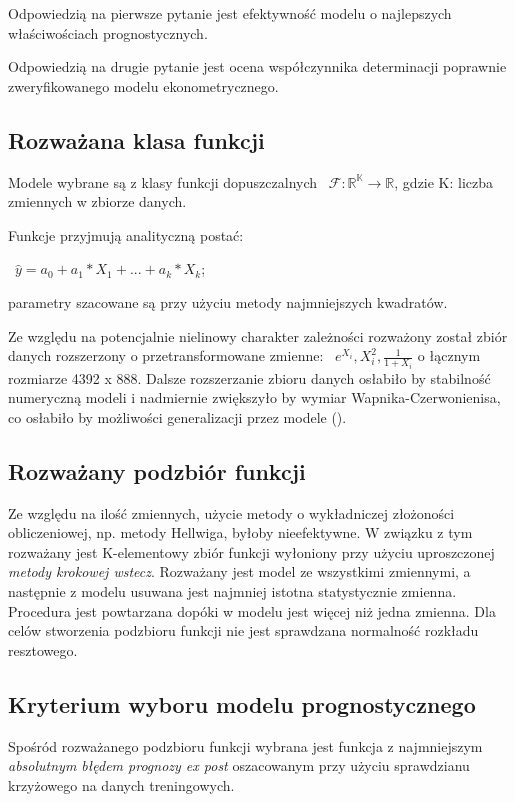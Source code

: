 \documentclass{article}
\begin{document}
Odpowiedzią na pierwsze pytanie jest efektywność modelu o najlepszych właściwościach prognostycznych.

Odpowiedzią na drugie pytanie jest ocena współczynnika determinacji poprawnie zweryfikowanego modelu ekonometrycznego.

\subsection{Rozważana klasa funkcji}
Modele wybrane są z klasy funkcji dopuszczalnych ~$\mathscr{F}: \mathbb{R^K\to R}$,
gdzie K: liczba zmiennych w zbiorze danych.

Funkcje przyjmują analityczną postać:

~$\hat{y}=a_0+a_1*X_1+...+a_k*X_k$;

parametry szacowane są przy użyciu metody najmniejszych kwadratów.

Ze względu na potencjalnie nielinowy charakter zależności rozważony został zbiór danych rozszerzony o przetransformowane zmienne: ~$e^{X_i}, X_i^2, \frac{1}{1+X_i}$ o łącznym rozmiarze 4392 x 888. Dalsze rozszerzanie zbioru danych osłabiło by stabilność numeryczną modeli i nadmiernie zwiększyło by wymiar Wapnika-Czerwonienisa, co osłabiło by możliwości generalizacji przez modele (\textcite{Kaminski2017}).

\newpage
\subsection{Rozważany podzbiór funkcji}
Ze względu na ilość zmiennych, użycie metody o wykładniczej złożoności obliczeniowej, np. metody Hellwiga, byłoby nieefektywne. W związku z tym rozważany jest K-elementowy zbiór funkcji wyłoniony przy użyciu uproszczonej \textit{metody krokowej wstecz}. Rozważany jest model ze wszystkimi zmiennymi, a następnie z modelu usuwana jest najmniej istotna statystycznie zmienna. Procedura jest powtarzana dopóki w modelu jest więcej niż jedna zmienna. Dla celów stworzenia podzbioru funkcji nie jest sprawdzana normalność rozkładu resztowego.

\subsection{Kryterium wyboru modelu prognostycznego}
Spośród rozważanego podzbioru funkcji wybrana jest funkcja z najmniejszym \textit{absolutnym błędem prognozy ex post} oszacowanym przy użyciu sprawdzianu krzyżowego na danych treningowych.
\end{document}
